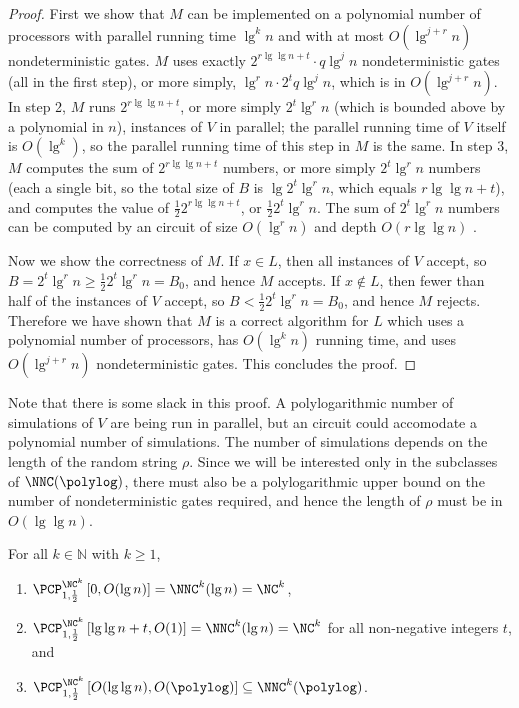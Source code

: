 \documentclass[]{article}
\newcommand{\PCPcs}[5]{\PCP^{#1}_{#2, #3}\left[#4, #5\right]}
\begin{document}
\begin{proof}
  First we show that $M$ can be implemented on a polynomial number of processors with parallel running time $\lg^k n$ and with at most $O(\lg^{j + r} n)$ nondeterministic gates.
  $M$ uses exactly $2^{r \lg \lg n + t}\cdot q \lg^j n$ nondeterministic gates (all in the first step), or more simply, $\lg^r n \cdot 2^t q \lg^j n$, which is in $O(\lg^{j + r} n)$.
  In step 2, $M$ runs $2^{r \lg \lg n + t}$, or more simply $2^t \lg^r n$ (which is bounded above by a polynomial in $n$), instances of $V$ in parallel; the parallel running time of $V$ itself is $O(\lg^k)$, so the parallel running time of this step in $M$ is the same.
  In step 3, $M$ computes the sum of $2^{r \lg \lg n + t}$ numbers, or more simply $2^t \lg^r n$ numbers (each a single bit, so the total size of $B$ is $\lg 2^t \lg^r n$, which equals $r \lg \lg n + t$), and computes the value of $\frac{1}{2} 2^{r \lg \lg n + t}$, or $\frac{1}{2} 2^t \lg^r n$.
  The sum of $2^t \lg^r n$ numbers can be computed by an \NC{} circuit of size $O(\lg^r n)$ and depth $O(r \lg \lg n)$ \cite[Theorem~2.6.1]{savage98}.

  Now we show the correctness of $M$.
  If $x \in L$, then all instances of $V$ accept, so $B = 2^t \lg^r n \geq \frac{1}{2} 2^t \lg^r n = B_0$, and hence $M$ accepts.
  If $x \notin L$, then fewer than half of the instances of $V$ accept, so $B < \frac{1}{2} 2^t \lg^r n = B_0$, and hence $M$ rejects.
  Therefore we have shown that $M$ is a correct algorithm for $L$ which uses a polynomial number of processors, has $O(\lg^k n)$ running time, and uses $O(\lg^{j + r} n)$ nondeterministic gates.
  This concludes the proof.
\end{proof}

Note that there is some slack in this proof.
A polylogarithmic number of simulations of $V$ are being run in parallel, but an \NNC{} circuit could accomodate a polynomial number of simulations.
The number of simulations depends on the length of the random string $\rho$.
Since we will be interested only in the subclasses of $\NNC(\polylog)$, there must also be a polylogarithmic upper bound on the number of nondeterministic gates required, and hence the length of $\rho$ must be in $O(\lg \lg n)$.

\begin{corollary}
  For all $k \in \mathbb{N}$ with $k \geq 1$,
  \begin{enumerate}
  \item $\PCPcs{\NC^k}{1}{\frac{1}{2}}{0}{O(\lg n)} = \NNC^k(\lg n) = \NC^k$,
  \item $\PCPcs{\NC^k}{1}{\frac{1}{2}}{\lg \lg n + t}{O(1)} = \NNC^k(\lg n) = \NC^k$ for all non-negative integers $t$, and
  \item $\PCPcs{\NC^k}{1}{\frac{1}{2}}{O(\lg \lg n)}{O(\polylog)} \subseteq \NNC^k(\polylog)$.
  \end{enumerate}
\end{corollary}
\end{document}
